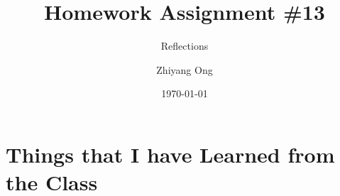 \documentclass[xcolor={usenames,dvipsnames},hyperref={hyperindex,bookmarks}]{beamer}
\title[ISEN 689 Writing Grant Proposals]
{\huge 
Homework Assignment \#13}
\subtitle{Reflections}
\author{Zhiyang Ong}
\institute{
	Department of Electrical and Computer Engineering \\
	College of Engineering,\\
	Texas A\&M University \\
	College Station, TX
}
\date{\today}	%
\begin{document}
\begin{frame}
\titlepage
\end{frame}



%






%
%



%










\section{Things that I have Learned from the Class}
\end{document}
